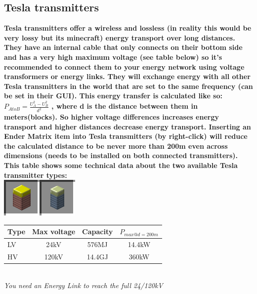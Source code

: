 \documentclass[11pt]{article} %
\begin{document}
\subsection{Tesla transmitters}
\bf Tesla transmitters \rm offer a wireless and lossless (in reality this would be very lossy but its minecraft) energy transport over long distances. They have an internal cable that only connects on their bottom side and has a very high maximum voltage (see table below) so it's recommended to connect them to your energy network using voltage transformers or energy links. They will exchange energy with all other Tesla transmitters in the world that are set to the same frequency (can be set in their GUI). This energy transfer is calculated like so: ${P_{A to B} = \frac{U_A^2 - U_B^2}{d^2}}$ , where d is the distance between them in meters(blocks). So higher voltage differences increases energy transport and higher distances decrease energy transport. Inserting an Ender Matrix item into Tesla transmitters (by right-click) will reduce the calculated distance to be never more than 200m even across dimensions (needs to be installed on both connected transmitters). This table shows some technical data about the two  available Tesla transmitter types:\\
\includegraphics[align = m]{blockTesla}
\begin{tabular}{| l | c | c | c |} \hline
\bf Type & \bf Max voltage & \bf Capacity & \bf $P_{max @ d=200m}$ \\ \hline
LV & 24kV & 576MJ & 14.4kW \\
HV & 120kV & 14.4GJ & 360kW \\ \hline
\end{tabular} \\
\it You need an Energy Link to reach the full 24/120kV \rm
\end{document}

